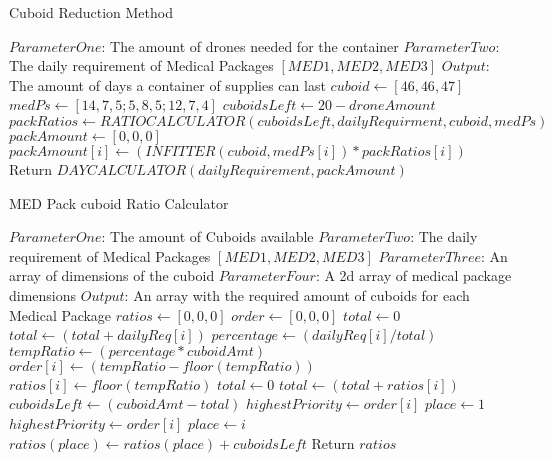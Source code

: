\documentclass{article}
\begin{document}
    \begin{algorithm}
	    \caption{Cuboid Reduction Method}
		\begin{algorithmic}[1]
			\State $ParameterOne$: The amount of drones needed for the container
			\State $ParameterTwo$: The daily requirement of Medical Packages $[MED 1,MED 2,MED 3]$ 
			\State $Output$: The amount of days a container of supplies can last
			\State
			\State $cuboid \leftarrow [46, 46, 47]$
			\State $medPs \leftarrow  [14, 7, 5 ; 5, 8, 5 ; 12, 7, 4]$ 
			\State $cuboidsLeft \leftarrow 20 - droneAmount$ 
			\State
			\State $packRatios \leftarrow RATIOCALCULATOR(cuboidsLeft, dailyRequirment, cuboid, medPs)$
			\State
			\State $packAmount \leftarrow [0,0,0] $
			\State $packAmount[i] \leftarrow ( INFITTER(cuboid, medPs[i] ) * packRatios[i] )$
			\EndFor
			\State
			\State Return $DAYCALCULATOR(dailyRequirement, packAmount)$
			\EndProcedure
		\end{algorithmic}
	\end{algorithm}
	
	\begin{algorithm}
	    \caption{MED Pack cuboid Ratio Calculator}
		\begin{algorithmic}[1]
			\State $ParameterOne$: The amount of Cuboids available
			\State $ParameterTwo$: The daily requirement of Medical Packages $[MED 1,MED 2,MED 3]$ 
			\State $ParameterThree$: An array of dimensions of the cuboid 
			\State $ParameterFour$: A 2d array of medical package dimensions
			\State $Output$: An array with the required amount of cuboids for each Medical Package
			\State
			\State $ratios \leftarrow [0,0,0]$
			\State $order \leftarrow  [0,0,0]$
			\State
			\State $total \leftarrow 0$
			\State $total \leftarrow (total + dailyReq[i])$
			\EndFor
			\State
			\State $percentage \leftarrow (dailyReq[i]/total)$
			\State $tempRatio \leftarrow (percentage * cuboidAmt)$
			\State $order[i] \leftarrow (tempRatio - floor(tempRatio))$ 
			\State $ratios[i] \leftarrow floor(tempRatio) $
			\EndFor
			\State
			\State $total \leftarrow 0$
			\State $total \leftarrow (total + ratios[i])$ 
			\EndFor
			\State
			\State $cuboidsLeft \leftarrow (cuboidAmt - total)$
			\State $highestPriority \leftarrow order[i]$
			\State $place \leftarrow 1$
			 
			\State $highestPriority \leftarrow order[i]$
			\State $place \leftarrow i$
			\EndIf
			\EndFor
			\State
			\State $ratios(place) \leftarrow ratios(place) + cuboidsLeft$ 
			\State Return $ratios$
			\EndProcedure
		\end{algorithmic}
	\end{algorithm}
	
\end{document}
